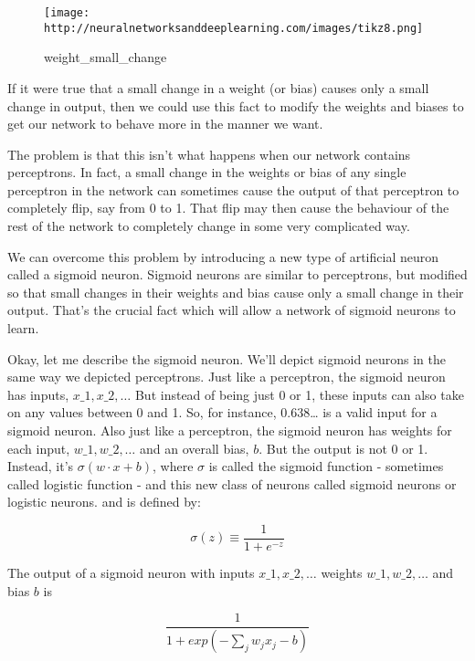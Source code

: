 \documentclass[]{article}
\begin{document}
\begin{figure}[htbp]
\centering
\texttt{[image: http://neuralnetworksanddeeplearning.com/images/tikz8.png]}
\caption{weight\_small\_change}
\end{figure}

If it were true that a small change in a weight (or bias) causes only a
small change in output, then we could use this fact to modify the
weights and biases to get our network to behave more in the manner we
want.

The problem is that this isn't what happens when our network contains
perceptrons. In fact, a small change in the weights or bias of any
single perceptron in the network can sometimes cause the output of that
perceptron to completely flip, say from 0 to 1. That flip may then cause
the behaviour of the rest of the network to completely change in some
very complicated way.

We can overcome this problem by introducing a new type of artificial
neuron called a sigmoid neuron. Sigmoid neurons are similar to
perceptrons, but modified so that small changes in their weights and
bias cause only a small change in their output. That's the crucial fact
which will allow a network of sigmoid neurons to learn.

Okay, let me describe the sigmoid neuron. We'll depict sigmoid neurons
in the same way we depicted perceptrons. Just like a perceptron, the
sigmoid neuron has inputs, $ x\_1, x\_2, \ldots{} $ But instead of
being just 0 or 1, these inputs can also take on any values between 0
and 1. So, for instance, 0.638\ldots{} is a valid input for a sigmoid
neuron. Also just like a perceptron, the sigmoid neuron has weights for
each input, $ w\_1, w\_2, \ldots{} $ and an overall bias, $ b
$. But the output is not 0 or 1. Instead, it's $ \sigma (w \cdot x + b) $,
where $ \sigma $ is called the sigmoid function - sometimes called
logistic function - and this new class of neurons called sigmoid neurons
or logistic neurons. and is defined by:

\begin{equation}
    \sigma(z) \equiv \frac{1}{1 + e^{-z}}
\end{equation}

The output of a sigmoid neuron with inputs $ x\_1, x\_2, \ldots{} $
weights $ w\_1, w\_2, \ldots{} $ and bias $ b $ is

\begin{equation}
    \frac {1}{1+exp(−\sum_j w_jx_j − b)}
\end{equation}
\end{document}

